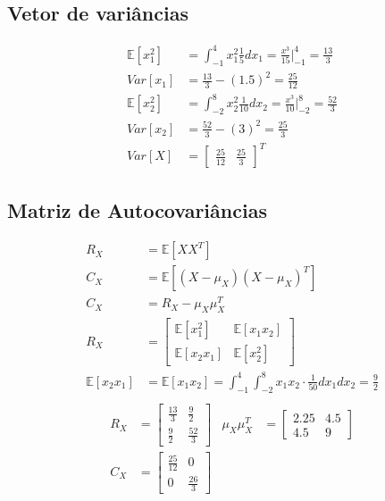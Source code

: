 \documentclass{article}
\begin{document}
\subsection{Vetor de variâncias}
\begin{align*}
    \mathbb{E}[x_1^2] &= \int_{-1}^4 x_1^2 \frac{1}{5}dx_1 = \frac{x^3}{15} \bigg\rvert_{-1}^{4} = \frac{13}{3} \\
    Var[x_1] &= \frac{13}{3} - (1.5)^2 = \frac{25}{12} \\
    \mathbb{E}[x_2^2] &= \int_{-2}^8 x_2^2 \frac{1}{10}dx_2 = \frac{x^3}{10} \bigg\rvert_{-2}^{8} = \frac{52}{3} \\
    Var[x_2] &= \frac{52}{3} - (3)^2 = \frac{25}{3} \\
    Var[X] &= \begin{bmatrix} \frac{25}{12} & \frac{25}{3} \end{bmatrix}^T
\end{align*}

\subsection{Matriz de Autocovariâncias}
\begin{align*}
    R_X &= \mathbb{E}[XX^T] \\
    C_X &= \mathbb{E}[(X-\mu_X)(X-\mu_X)^T] \\
    C_X &= R_X - \mu_X\mu_X^T \\
    R_X &= \begin{bmatrix} \mathbb{E}[x_1^2] & \mathbb{E}[x_1x_2]\\\mathbb{E}[x_2x_1] & \mathbb{E}[x_2^2] \end{bmatrix}  \\
    \mathbb{E}[x_2x_1] &= \mathbb{E}[x_1x_2] = \int_{-1}^4 \int_{-2}^8 x_1x_2 \cdot \frac{1}{50}
    dx_1 dx_2 = \frac{9}{2} \\
\end{align*}
\begin{align*}
    R_X &= \begin{bmatrix} \frac{13}{3} & \frac{9}{2}\\\frac{9}{2} & \frac{52}{3} \end{bmatrix} &
    \mu_X\mu_X^T &= \begin{bmatrix} 2.25 & 4.5\\4.5 & 9 \end{bmatrix} \\
    C_X &= \begin{bmatrix} \frac{25}{12} & 0\\0 & \frac{26}{3} \end{bmatrix}
\end{align*}
\end{document}

